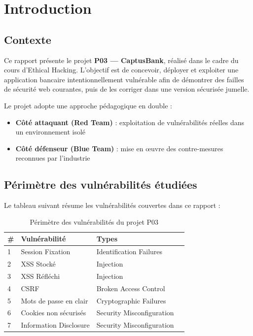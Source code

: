 \documentclass[12pt,a4paper]{report}
\begin{document}
\tableofcontents
\newpage

\chapter{Introduction}

\section{Contexte}

Ce rapport présente le projet \textbf{P03 — CaptusBank}, réalisé dans le cadre du cours d'Ethical Hacking. L'objectif est de concevoir, déployer et exploiter une application bancaire intentionnellement vulnérable afin de démontrer des failles de sécurité web courantes, puis de les corriger dans une version sécurisée jumelle.

Le projet adopte une approche pédagogique en double :
\begin{itemize}
  \item \textbf{Côté attaquant (Red Team)} : exploitation de vulnérabilités réelles dans un environnement isolé
  \item \textbf{Côté défenseur (Blue Team)} : mise en œuvre des contre-mesures reconnues par l'industrie
\end{itemize}

\section{Périmètre des vulnérabilités étudiées}

Le tableau suivant résume les vulnérabilités couvertes dans ce rapport :

\begin{table}[H]
\centering
\small
\begin{tabular}{@{}llll@{}}
\toprule
\textbf{\#} & \textbf{Vulnérabilité} & \textbf{Types} \\
\midrule
1 & Session Fixation &  Identification Failures \\
2 & XSS Stocké &  Injection \\
3 & XSS Réfléchi &  Injection \\
4 & CSRF &  Broken Access Control \\
5 & Mots de passe en clair & Cryptographic Failures  \\
6 & Cookies non sécurisés & Security Misconfiguration \\
7 & Information Disclosure & Security Misconfiguration  \\
\bottomrule
\end{tabular}
\caption{Périmètre des vulnérabilités du projet P03}
\end{table}
\end{document}
